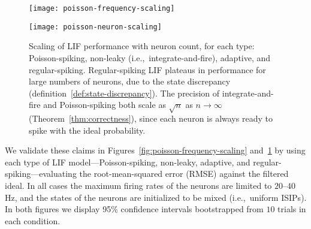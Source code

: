 \begin{figure}
\centering
\texttt{[image: poisson-frequency-scaling]}
\caption[Spiking neuron performance with input frequency.]{\label{fig:poisson-frequency-scaling} Scaling of LIF performance with frequency, for each type: Poisson-spiking, non-leaky (i.e.,~integrate-and-fire), adaptive, and regular-spiking.
The input is a sinusoid with frequency $f$\,Hz.
Due to the memoryless property of the Poisson process, and the uniformity of ReLU, both outperform LIF with constant precision as $f \rightarrow \infty$ (Theorem~\ref{thm:correctness}), assuming $n$ and $\tau$ are scaled appropriately with frequency (see text for details).
}

\vspace{1em}

\texttt{[image: poisson-neuron-scaling]}
\caption[Spiking neuron performance with neuron count.]{\label{fig:poisson-neuron-scaling} Scaling of LIF performance with neuron count, for each type: Poisson-spiking, non-leaky (i.e.,~integrate-and-fire), adaptive, and regular-spiking.
Regular-spiking LIF plateaus in performance for large numbers of neurons, due to the state discrepancy (definition~\ref{def:state-discrepancy}).
The precision of integrate-and-fire and Poisson-spiking both scale as ${\sqrt{n}}$ as $n \rightarrow \infty$ (Theorem~\ref{thm:correctness}), since each neuron is always ready to spike with the ideal probability. 
}
\end{figure}

We validate these claims in Figures~\ref{fig:poisson-frequency-scaling} and~\ref{fig:poisson-neuron-scaling} by using each type of LIF model---Poisson-spiking, non-leaky, adaptive, and regular-spiking---evaluating the root-mean-squared error (RMSE) against the filtered ideal.
In all cases the maximum firing rates of the neurons are limited to $20$--$40$\,Hz, and the states of the neurons are initialized to be mixed (i.e.,~uniform ISIPs).
In both figures we display 95\% confidence intervals bootstrapped from $10$ trials in each condition.

